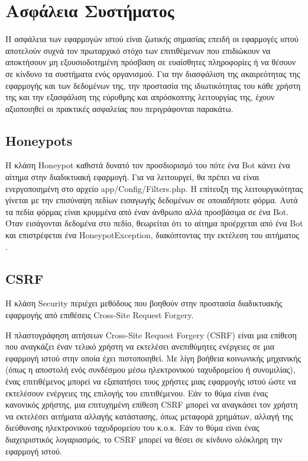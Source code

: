 \section{Ασφάλεια Συστήματος}
Η ασφάλεια των εφαρμογών ιστού είναι ζωτικής σημασίας επειδή οι εφαρμογές ιστού αποτελούν συχνά τον πρωταρχικό στόχο των επιτιθέμενων που επιδιώκουν να αποκτήσουν μη εξουσιοδοτημένη πρόσβαση σε ευαίσθητες πληροφορίες ή να θέσουν σε κίνδυνο τα συστήματα ενός οργανισμού. Για την διασφάλιση της ακαιρεότητας της εφαρμογής και των δεδομένων της, την προστασία της ιδιωτικότητας του κάθε χρήστη της και την εξασφάλιση της εύρυθμης και απρόσκοπτης λειτουργίας της, έχουν αξιοποιηθεί οι πρακτικές ασφαλείας που περιγράφονται παρακάτω.

\subsection{Honeypots}
Η κλάση Honeypot καθιστά δυνατό τον προσδιορισμό του πότε ένα Bot κάνει ένα αίτημα στην διαδικτυακή εφαρμογή. Για να λειτουργεί, θα πρέπει να είναι ενεργοποιημένη στο αρχείο app/Config/Filters.php. Η επίτευξη της λειτουργικότητας γίνεται με την επισύναψη πεδίων εισαγωγής δεδομένων σε οποιαδήποτε φόρμα. Αυτά τα πεδία φόρμας είναι κρυμμένα από έναν άνθρωπο αλλά προσβάσιμα σε ένα Bot. Όταν εισάγονται δεδομένα στο πεδίο, θεωρείται ότι το αίτημα προέρχεται από ένα Bot και επιστρέφεται ένα HoneypotException, διακόπτοντας την εκτέλεση του αιτήματος \cite{CodeIgniter_honeypots}.

\subsection{CSRF}
Η κλάση Security περιέχει μεθόδους που βοηθούν στην προστασία διαδικτυακής εφαρμογής από επιθέσεις Cross-Site Request Forgery.

Η πλαστογράφηση αιτήσεων Cross-Site Request Forgery (CSRF) είναι μια επίθεση που αναγκάζει έναν τελικό χρήστη να εκτελέσει ανεπιθύμητες ενέργειες σε μια εφαρμογή ιστού στην οποία έχει πιστοποιηθεί. Με λίγη βοήθεια κοινωνικής μηχανικής (όπως η αποστολή ενός συνδέσμου μέσω ηλεκτρονικού ταχυδρομείου ή συνομιλίας), ένας επιτιθέμενος μπορεί να εξαπατήσει τους χρήστες μιας εφαρμογής ιστού ώστε να εκτελέσουν ενέργειες της επιλογής του επιτιθέμενου. Εάν το θύμα είναι ένας κανονικός χρήστης, μια επιτυχημένη επίθεση CSRF μπορεί να αναγκάσει τον χρήστη να εκτελέσει αιτήματα αλλαγής κατάστασης, όπως μεταφορά χρημάτων, αλλαγή της διεύθυνσης ηλεκτρονικού ταχυδρομείου του κ.ο.κ. Εάν το θύμα είναι ένας διαχειριστικός λογαριασμός, το CSRF μπορεί να θέσει σε κίνδυνο ολόκληρη την εφαρμογή ιστού.

